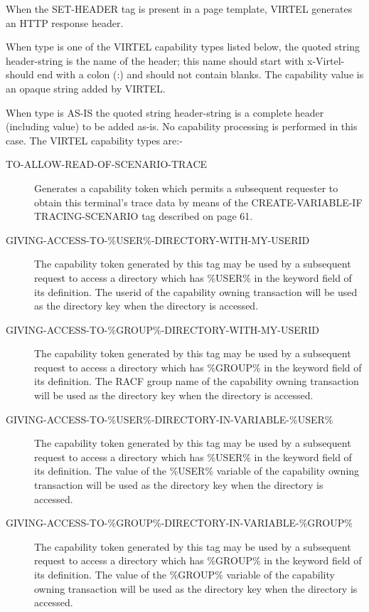 \documentclass[letterpaper,10pt,english]{sphinxmanual}
\begin{document}
When the SET-HEADER tag is present in a page template, VIRTEL generates an HTTP response header.

When type is one of the VIRTEL capability types listed below, the quoted string header-string is the name of the header; this name should start with x-Virtel- should end with a colon (:) and should not contain blanks. The capability value is an opaque string added by VIRTEL.

When type is AS-IS the quoted string header-string is a complete header (including value) to be added as-is. No capability processing is performed in this case.
\label{\detokenize{User_Guide:v457ug-capability-types}}
The VIRTEL capability types are:-
\begin{description}
\item[{TO-ALLOW-READ-OF-SCENARIO-TRACE}] \leavevmode
Generates a capability token which permits a subsequent requester to obtain this terminal’s trace data by means of the CREATE-VARIABLE-IF TRACING-SCENARIO tag described on page 61.

\item[{GIVING-ACCESS-TO-\%USER\%-DIRECTORY-WITH-MY-USERID}] \leavevmode
The capability token generated by this tag may be used by a subsequent request to access a directory which has \%USER\% in the keyword field of its definition. The userid of the capability owning transaction will be used as the directory key when the directory is accessed.

\item[{GIVING-ACCESS-TO-\%GROUP\%-DIRECTORY-WITH-MY-USERID}] \leavevmode
The capability token generated by this tag may be used by a subsequent request to access a directory which has \%GROUP\% in the keyword field of its definition. The RACF group name of the capability owning transaction will be used as the directory key when the directory is accessed.

\item[{GIVING-ACCESS-TO-\%USER\%-DIRECTORY-IN-VARIABLE-\%USER\%}] \leavevmode
The capability token generated by this tag may be used by a subsequent request to access a directory which has \%USER\% in the keyword field of its definition. The value of the \%USER\% variable of the capability owning transaction will be used as the directory key when the directory is accessed.

\item[{GIVING-ACCESS-TO-\%GROUP\%-DIRECTORY-IN-VARIABLE-\%GROUP\%}] \leavevmode
The capability token generated by this tag may be used by a subsequent request to access a directory which has \%GROUP\% in the keyword field of its definition. The value of the \%GROUP\% variable of the capability owning transaction will be used as the directory key when the directory is accessed.

\end{description}
\end{document}
